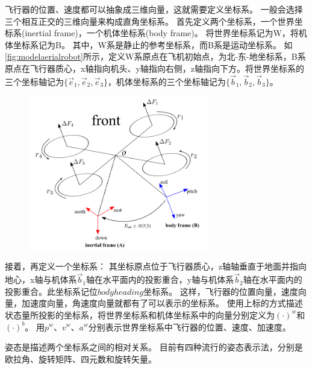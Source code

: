 \documentclass[
  type=master
]{gdutthesis}
\begin{document}
飞行器的位置、速度都可以抽象成三维向量，这就需要定义坐标系。
一般会选择三个相互正交的三维向量来构成直角坐标系。
首先定义两个坐标系，一个世界坐标系(inertial frame)，一个机体坐标系(body frame)。
将世界坐标系记为W，将机体坐标系记为B。
其中，W系是静止的参考坐标系，而B系是运动坐标系。
如\autoref{fig:modelaerialrobot}所示，定义W系原点在飞机初始点，为北-东-地坐标系，B系原点在飞行器质心，x轴指向机头、y轴指向右侧，z轴指向下方。将世界坐标系的三个坐标轴记为$\big\{ \vec{e}_1,\vec{e}_2,\vec{e}_3 \big\}$，机体坐标系的三个坐标轴记为$\big\{ \vec{b}_1,\vec{b}_2,\vec{b}_3 \big\}$。
\begin{figure}[htbp]
	\centering
	\includegraphics[width=0.7\textwidth]{屏幕截图 2022-03-31 222546.png}
	\label{fig:modelaerialrobot}
\end{figure}
接着，再定义一个坐标系：
其坐标原点位于飞行器质心，z轴轴垂直于地面并指向地心，x轴与机体系$\vec{b}_1$轴在水平面内的投影重合，y轴与机体系$\vec{b}_2$轴在水平面内的投影重合。此坐标系记位$bodyheading$坐标系。
这样，飞行器的位置向量，速度向量，加速度向量，角速度向量就都有了可以表示的坐标系。
使用上标的方式描述状态量所投影的坐标系，将世界坐标系和机体坐标系中的向量分别定义为$(\cdot)^w$和$(\cdot)^b$。
用$p^w$、$v^w$、$a^w$分别表示世界坐标系中飞行器的位置、速度、加速度。

姿态是描述两个坐标系之间的相对关系。
目前有四种流行的姿态表示法，分别是欧拉角、旋转矩阵、四元数和旋转矢量\cite{shuster1993survey}。
\end{document}

